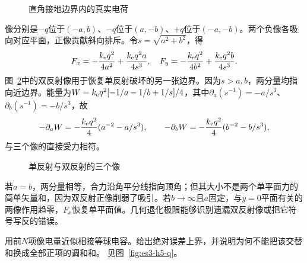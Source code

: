 \begin{figure}[H]\centering
{}
\caption{直角接地边界内的真实电荷}\label{fig:es3-h4-q}
\end{figure}
\begin{solution}
像分别是$-q$位于$(-a,b)$、$-q$位于$(a,-b)$、$+q$位于$(-a,-b)$。两个负像各吸向对应平面，正像贡献斜向排斥。令$s=\sqrt{a^2+b^2}$，得
\[F_x=-\frac{k_{\rm e} q^2}{4a^2}+\frac{k_{\rm e} q^2a}{4s^3},\quad
F_y=-\frac{k_{\rm e} q^2}{4b^2}+\frac{k_{\rm e} q^2b}{4s^3}.
\]
图~\ref{fig:es3-h4-s}中的双反射像用于恢复单反射破坏的另一张边界。因为$s>a,b$，两分量均指向近边界。能量为$W=k_{\rm e} q^2[-1/a-1/b+1/s]/4$，其中$\partial_a(s^{-1})=-a/s^3$、$\partial_b(s^{-1})=-b/s^3$，故
\[-\partial_aW=-\frac{k_{\rm e} q^2}{4}(a^{-2}-a/s^3),\qquad
-\partial_bW=-\frac{k_{\rm e} q^2}{4}(b^{-2}-b/s^3),\]
与三个像的直接受力相符。
\begin{figure}[H]\centering
{}
\caption{单反射与双反射的三个像}\label{fig:es3-h4-s}
\end{figure}


若$a=b$，两分量相等，合力沿角平分线指向顶角；但其大小不是两个单平面力的简单矢量和，因为双反射正像削弱了吸引。若$b\to\infty$且$a$固定，与$y=0$平面有关的两像作用趋零，$F_x$恢复单平面值。几何退化极限能够识别遗漏双反射像或把它符号写反的错误。
\end{solution}

\begin{exercise}[接触双球的截断误差]\label{ex:es3-h5}
用前$N$项像电量近似相接等球电容。给出绝对误差上界，并说明为何不能把该交替和换成全部正项的调和和。 见图~\ref{fig:es3-h5-q}。
\end{exercise}

